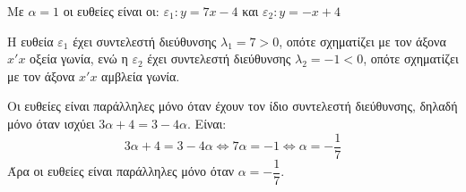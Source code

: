 
\begin{alist}
\item 
\begin{rlist}
\item Με $\alpha = 1$ οι ευθείες είναι οι:
$\varepsilon_1 : y = 7x - 4$ και $\varepsilon_2 : y = -x + 4$
\item Η ευθεία $\varepsilon_1$ έχει συντελεστή διεύθυνσης $\lambda_1 = 7 > 0$, οπότε σχηματίζει με τον άξονα $x'x$
οξεία γωνία, ενώ η $\varepsilon_2$ έχει συντελεστή διεύθυνσης $\lambda_2 = -1 < 0$, οπότε σχηματίζει με τον
άξονα $x'x$ αμβλεία γωνία.
\end{rlist}

\item Οι ευθείες είναι παράλληλες μόνο όταν έχουν τον ίδιο συντελεστή διεύθυνσης, δηλαδή
μόνο όταν ισχύει $3\alpha + 4 = 3 - 4\alpha$. Είναι:
\[3\alpha + 4 = 3 - 4\alpha \Leftrightarrow 7\alpha = -1 \Leftrightarrow \alpha = -\dfrac{1}{7}\]
Άρα οι ευθείες είναι παράλληλες μόνο όταν $\alpha = -\dfrac{1}{7}$.
\end{alist}

